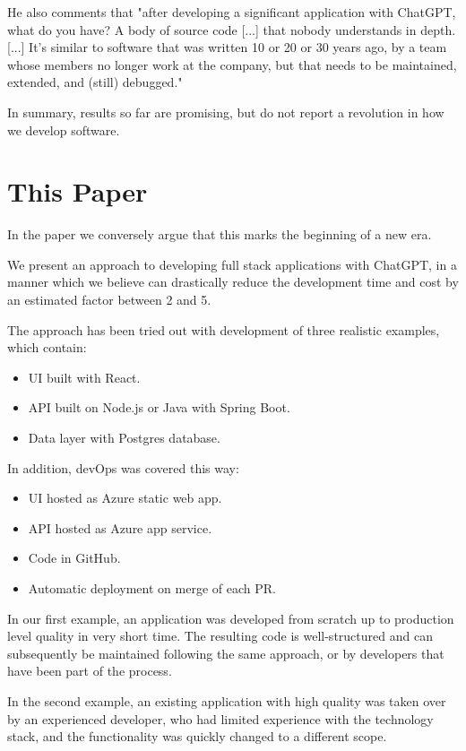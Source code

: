 \documentclass[runningheads]{llncs}
\begin{document}
He also comments that "after developing a significant application with ChatGPT, what do you have? A body of source code [...] that nobody understands in depth. [...] It's similar to software that was written 10 or 20 or 30 years ago, by a team whose members no longer work at the company, but that needs to be maintained, extended, and (still) debugged."

In summary, results so far are promising, but do not report a revolution in how we develop software.
%
\section*{This Paper}
In the paper we conversely argue that this marks the beginning of a new era. 

We present an approach to developing full stack applications with ChatGPT, in a manner which we believe can drastically reduce the development time and cost by an estimated factor between 2 and 5. 

The approach has been tried out with development of three realistic examples, which contain:
\begin{itemize}
    \item UI built with React.
    \item API built on Node.js or Java with Spring Boot.
    \item Data layer with Postgres database.
\end{itemize}

In addition, devOps was covered this way:
\begin{itemize}
    \item UI hosted as Azure static web app.
    \item API hosted as Azure app service.
    \item Code in GitHub.
    \item Automatic deployment on merge of each PR.
\end{itemize}

In our first example, an application was developed from scratch up to production level quality in very short time. The resulting code is well-structured and can subsequently be maintained following the same approach, or by developers that have been part of the process.

In the second example, an existing application with high quality was taken over by an experienced developer, who had limited experience with the technology stack, and the functionality was quickly changed to a different scope. 
\end{document}
